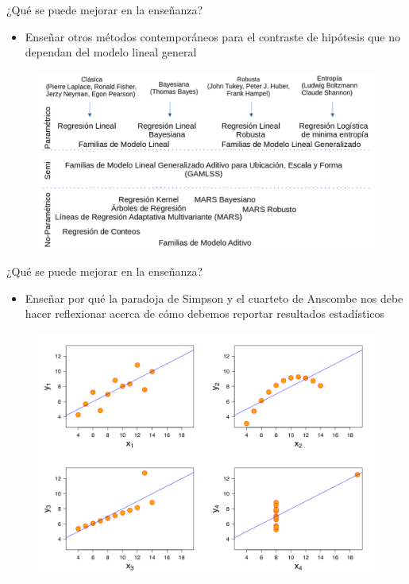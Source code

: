 \documentclass{beamer}
\begin{document}
\begin{frame}{¿Qué se puede mejorar en la enseñanza?}
\begin{itemize}
\item Enseñar otros métodos contemporáneos para el contraste de hipótesis que no dependan del modelo lineal general \cite{Mair2020}
\end{itemize}    
\begin{figure}
\includegraphics[width=.9\textwidth]{Arbol.png}
\end{figure}
\end{frame}


\begin{frame}{¿Qué se puede mejorar en la enseñanza?}
\begin{itemize}
\item Enseñar por qué la paradoja de Simpson y el cuarteto de Anscombe nos debe hacer reflexionar acerca de cómo debemos reportar resultados estadísticos \cite{Fulton2008}
\end{itemize}    
\begin{figure}
\includegraphics[width=.6\textwidth]{AQ.png}
\end{figure}
\end{frame}
\end{document}
